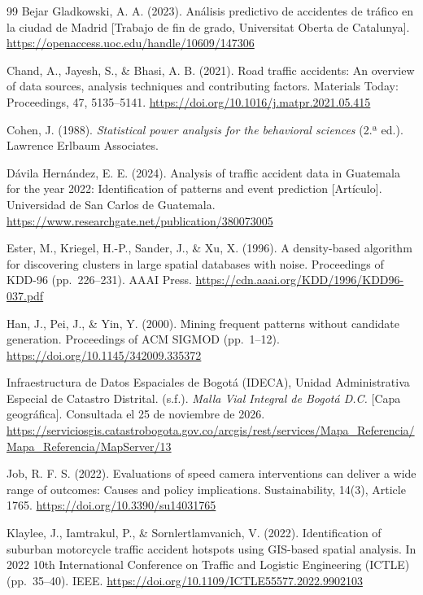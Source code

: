 \documentclass[12pt,letterpaper]{article}
\begin{document}
\clearpage
\begin{thebibliography}{99}
Bejar Gladkowski, A. A. (2023). Análisis predictivo de accidentes de
  tráfico en la ciudad de Madrid {[}Trabajo de fin de grado, Universitat
  Oberta de Catalunya{]}.
  \url{https://openaccess.uoc.edu/handle/10609/147306}

Chand, A., Jayesh, S., \& Bhasi, A. B. (2021). Road traffic accidents:
  An overview of data sources, analysis techniques and contributing
  factors. Materials Today: Proceedings, 47, 5135--5141.
  \url{https://doi.org/10.1016/j.matpr.2021.05.415}

Cohen, J. (1988). \emph{Statistical power analysis for the behavioral sciences}
(2.ª ed.). Lawrence Erlbaum Associates.

Dávila Hernández, E. E. (2024). Analysis of traffic accident data in Guatemala for the year 2022:
Identification of patterns and event prediction [Artículo]. Universidad de San Carlos de Guatemala.
\url{https://www.researchgate.net/publication/380073005}

Ester, M., Kriegel, H.-P., Sander, J., \& Xu, X. (1996).
A density-based algorithm for discovering clusters in large spatial databases with noise.
Proceedings of KDD-96 (pp.~226--231). AAAI Press.
\url{https://cdn.aaai.org/KDD/1996/KDD96-037.pdf}

Han, J., Pei, J., \& Yin, Y. (2000). Mining frequent patterns without candidate generation.
Proceedings of ACM SIGMOD (pp.~1--12).
\url{https://doi.org/10.1145/342009.335372}

Infraestructura de Datos Espaciales de Bogotá (IDECA), Unidad Administrativa Especial de Catastro Distrital. (s.f.).
\emph{Malla Vial Integral de Bogotá D.C.} [Capa geográfica]. Consultada el 25 de noviembre de 2026.
\url{https://serviciosgis.catastrobogota.gov.co/arcgis/rest/services/Mapa_Referencia/Mapa_Referencia/MapServer/13}

Job, R. F. S. (2022). Evaluations of speed camera interventions can
  deliver a wide range of outcomes: Causes and policy implications.
  Sustainability, 14(3), Article 1765.
  \url{https://doi.org/10.3390/su14031765}

Klaylee, J., Iamtrakul, P., \& Sornlertlamvanich, V. (2022).
  Identification of suburban motorcycle traffic accident hotspots using
  GIS-based spatial analysis. In 2022 10th International Conference on
  Traffic and Logistic Engineering (ICTLE) (pp.~35--40). IEEE.
  \url{https://doi.org/10.1109/ICTLE55577.2022.9902103}


\end{thebibliography}
\end{document}
